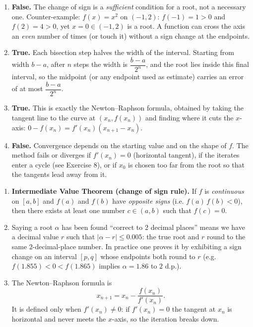 \documentclass[11pt]{article}
\begin{document}
\begin{corrige}
\begin{enumerate}
\item \textbf{False.} The change of sign is a \emph{sufficient} condition for a root, not a necessary one. Counter-example: $f(x) = x^{2}$ on $(-1, 2)$: $f(-1) = 1 > 0$ and $f(2) = 4 > 0$, yet $x = 0 \in (-1, 2)$ is a root. A function can cross the axis an \emph{even} number of times (or touch it) without a sign change at the endpoints.
\item \textbf{True.} Each bisection step halves the width of the interval. Starting from width $b - a$, after $n$ steps the width is $\dfrac{b-a}{2^{n}}$, and the root lies inside this final interval, so the midpoint (or any endpoint used as estimate) carries an error of at most $\dfrac{b-a}{2^{n}}$.
\item \textbf{True.} This is exactly the Newton--Raphson formula, obtained by taking the tangent line to the curve at $(x_{n}, f(x_{n}))$ and finding where it cuts the $x$-axis: $0 - f(x_{n}) = f'(x_{n})(x_{n+1} - x_{n})$.
\item \textbf{False.} Convergence depends on the starting value and on the shape of $f$. The method fails or diverges if $f'(x_{n}) = 0$ (horizontal tangent), if the iterates enter a cycle (see Exercise 8), or if $x_{0}$ is chosen too far from the root so that the tangents lead away from it.
\end{enumerate}
\end{corrige}

\begin{corrige}
\begin{enumerate}
\item \textbf{Intermediate Value Theorem (change of sign rule).} If $f$ is \emph{continuous} on $[a, b]$ and $f(a)$ and $f(b)$ have \emph{opposite signs} (i.e. $f(a)\,f(b) < 0$), then there exists at least one number $c \in (a, b)$ such that $f(c) = 0$.
\item Saying a root $\alpha$ has been found ``correct to $2$ decimal places'' means we have a decimal value $r$ such that $|\alpha - r| \leq 0.005$: the true root and $r$ round to the same $2$-decimal-place number. In practice one proves it by exhibiting a sign change on an interval $[p, q]$ whose endpoints both round to $r$ (e.g. $f(1.855) < 0 < f(1.865)$ implies $\alpha = 1.86$ to $2$ d.p.).
\item The Newton--Raphson formula is
\[ x_{n+1} = x_{n} - \frac{f(x_{n})}{f'(x_{n})}. \]
It is defined only when $f'(x_{n}) \neq 0$: if $f'(x_{n}) = 0$ the tangent at $x_{n}$ is horizontal and never meets the $x$-axis, so the iteration breaks down.
\end{enumerate}
\end{corrige}
\end{document}
